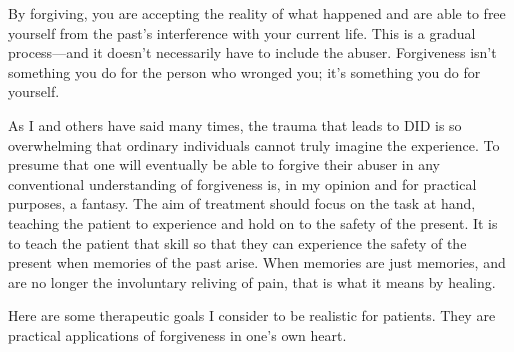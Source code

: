 \documentclass[]{book}
\begin{document}
By forgiving, you are accepting the reality of what happened and are able to free yourself from the past's interference with your current life. This is a gradual process---and it doesn't necessarily have to include the abuser. Forgiveness isn't something you do for the person who wronged you; it's something you do for yourself.

As I and others have said many times, the trauma that leads to DID is so overwhelming that ordinary individuals cannot truly imagine the experience. To presume that one will eventually be able to forgive their abuser in any conventional understanding of forgiveness is, in my opinion and for practical purposes, a fantasy. The aim of treatment should focus on the task at hand, teaching the patient to experience and hold on to the safety of the present. It is to teach the patient that skill so that they can experience the safety of the present when memories of the past arise. When memories are just memories, and are no longer the involuntary reliving of pain, that is what it means by healing.

Here are some therapeutic goals I consider to be realistic for patients. They are practical applications of forgiveness in one's own heart.
\end{document}
